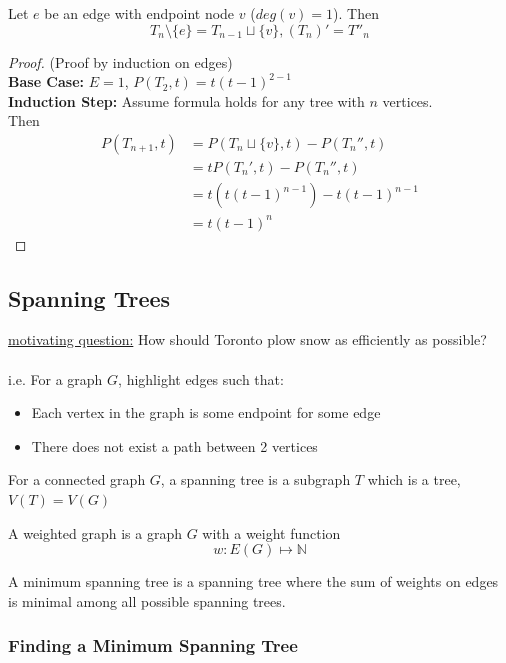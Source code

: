 \documentclass[12pt]{article}
\begin{document}
Let $e$ be an edge with endpoint node $v$ ($deg(v)=1$). Then 
$$T_n \setminus \{ e \} = T_{n-1} \sqcup \{ v \}, (T_n)' = T''_n$$
\begin{proof}
	(Proof by induction on edges)\\
	\textbf{Base Case:} $E=1$, $P(T_2, t) = t(t-1)^{2-1}$\\
	\textbf{Induction Step:} Assume formula holds for any tree with $n$ vertices.\\
	Then 
	\begin{align*}
		P(T_{n+1}, t) &= P(T_n \sqcup \{ v \}, t) - P(T_n'', t)\\
		&= t P(T_n', t) - P(T_n'',t)\\
		&= t(t(t-1)^{n-1}) - t(t-1)^{n-1}\\
		&= t(t-1)^n
	\end{align*}
\end{proof}

\subsection{Spanning Trees}

\underline{motivating question:} How should Toronto plow snow as efficiently as possible?\\
\\
i.e. For a graph $G$, highlight edges such that:
\begin{itemize}
	\item{Each vertex in the graph is some endpoint for some edge}
	\item{There does not exist a path between 2 vertices}
\end{itemize}

\begin{tcolorbox}[title=Definition: Spanning Tree]
	For a connected graph $G$, a spanning tree is a subgraph $T$ which is a tree, $V(T)=V(G)$
\end{tcolorbox}
\begin{tcolorbox}[title=Definition: Weighted graph]
	A weighted graph is a graph $G$ with a weight function $$w : E(G) \mapsto \mathbb{N}$$
\end{tcolorbox}
\begin{tcolorbox}[title=Definition: Minimum Spanning Tree]
	A minimum spanning tree is a spanning tree where the sum of weights on edges is minimal among all possible spanning trees.
\end{tcolorbox}

\subsubsection{Finding a Minimum Spanning Tree}
\end{document}
